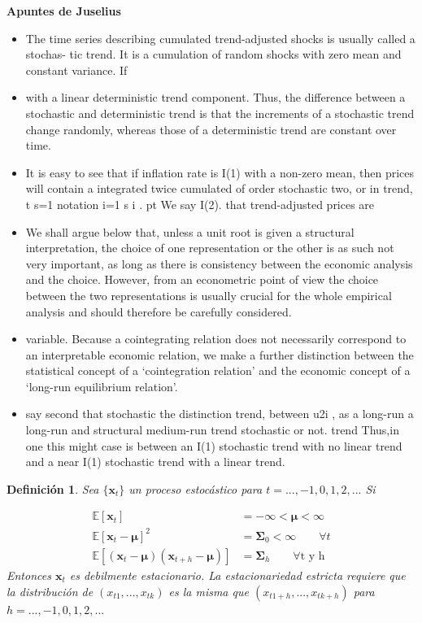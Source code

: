 \documentclass[12pt, twoside]{book}\usepackage[]{graphicx}\usepackage[]{color}
\numberwithin{equation}{section}
\numberwithin{theorem}{section}
\numberwithin{teorema}{section}
\newtheorem{defi}{Definición}
\newenvironment{defin}
      {\begin{shaded}\begin{defi}}
      {\end{defi}\end{shaded}}
\numberwithin{defi}{section}
\numberwithin{prop}{section}
\numberwithin{defi}{section}
\theoremstyle{plain}
\begin{document}

\textbf{Apuntes de Juselius}

\begin{itemize}
\item The time series describing cumulated trend-adjusted shocks is usually called a stochas-
tic trend. It is a cumulation of random shocks with zero mean and constant variance. If
\item with a linear deterministic trend component. Thus, the difference between a stochastic
and deterministic trend is that the increments of a stochastic trend change randomly,
whereas those of a deterministic trend are constant over time.
\item It is easy to see that if inflation rate is I(1) with a non-zero mean, then prices will contain
a integrated twice cumulated of order stochastic two, or in trend, 
t
 s=1 notation
i=1 s
 i . pt We  say I(2).
 that trend-adjusted prices are
\item We shall argue below that, unless a unit root is given a structural interpretation, the
choice of one representation or the other is as such not very important, as long as there is
consistency between the economic analysis and the choice. However, from an econometric
point of view the choice between the two representations is usually crucial for the whole
empirical analysis and should therefore be carefully considered.
\item variable.
Because a cointegrating relation does not necessarily correspond to an interpretable
economic relation, we make a further distinction between the statistical concept of a
‘cointegration relation’ and the economic concept of a ‘long-run equilibrium relation’.
\item say second that stochastic the distinction trend,
 between 
 u2i , as a long-run a long-run and structural medium-run trend stochastic or not. trend Thus,in one this might
 case
is between an I(1) stochastic trend with no linear trend and a near I(1) stochastic trend
with a linear trend.

\end{itemize}

\begin{defin}
Sea $\{\mathbf{x}_{t}\}$ un proceso estocástico para $t=..., -1,0,1,2,...$ Si 

\begin{align}
\mathbb{E}[\mathbf{x}_{t}] & =-\infty < \mathbf{\mu} <\infty \\ 
\mathbb{E}[\mathbf{x}_{t}-\mathbf{\mu}]^{2} & = \mathbf{\Sigma}_{0}<\infty \qquad \forall t\\ 
\mathbb{E}[(\mathbf{x}_{t}-\mathbf{\mu})(\mathbf{x}_{t+h}-\mathbf{\mu})] & = \mathbf{\Sigma}_{h} \qquad \forall \text{t y h}
\end{align}
Entonces $\mathbf{x}_{t}$ es \textit{debilmente estacionario}. La estacionariedad estricta requiere que la distribución de $(x_{t1},...,x_{tk})$ es la misma que $(x_{t1+h},...,x_{tk+h})$ para $h=...,-1,0,1,2,...$
\end{defin}
\end{document}
